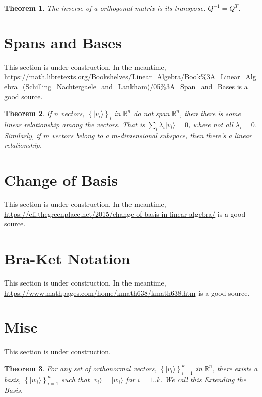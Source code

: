 \documentclass{amsbook}
\newtheorem{theorem}{Theorem}
\begin{document}
\begin{theorem}\label{OrthogonalMatrixInverse}
The inverse of a orthogonal matrix is its transpose.  $Q^{-1}=Q^T$.
\end{theorem}

\section{Spans and Bases}\label{Spans and Bases}

This section is under construction.  In the meantime, \url{https://math.libretexts.org/Bookshelves/Linear_Algebra/Book%3A_Linear_Algebra_(Schilling_Nachtergaele_and_Lankham)/05%3A_Span_and_Bases} is a good source.

\begin{theorem}\label{LinearRelationship}
If $n$ vectors, $\left\{|v_i\rangle\right\}_i$ in $\mathbb R^n$ do not span $\mathbb R^n$, then there is some linear relationship among the vectors.  That is $\sum_i\lambda_i|v_i\rangle=0$, where not all $\lambda_i=0$.  Similarly, if $m$ vectors belong to a $m$-dimensional subspace, then there's a linear relationship.
\end{theorem}

\section{Change of Basis}\label{Change of Basis}

This section is under construction.  In the meantime, \url{https://eli.thegreenplace.net/2015/change-of-basis-in-linear-algebra/} is a good source.

\section{Bra-Ket Notation}\label{Bra-Ket Notation}

This section is under construction.  In the meantime, \url{https://www.mathpages.com/home/kmath638/kmath638.htm} is a good source.

\section{Misc}

This section is under construction.

\begin{theorem}
\label{ExtendBasis}
For any set of orthonormal vectors, $\left\{|v_i\rangle\right\}_{i=1}^k$ in $\mathbb R^n$, there exists a basis, $\left\{|w_i\rangle\right\}_{i=1}^n$ such that $|v_i\rangle=|w_i\rangle$ for $i=1..k$.  We call this {\em Extending the Basis}.
\end{theorem}
\end{document}

